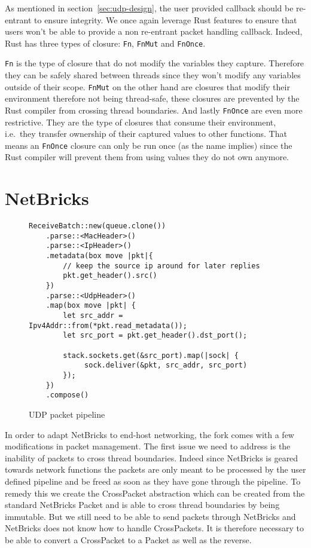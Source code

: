 As mentioned in section~\ref{sec:udp-design}, the user provided callback
should be re-entrant to ensure integrity. We once again leverage Rust
features to ensure that users won't be able to provide a non
re-entrant packet handling callback. Indeed, Rust has three types of
closure: \texttt{Fn}, \texttt{FnMut} and \texttt{FnOnce}.

\texttt{Fn} is the type of closure that do not modify the variables
they capture. Therefore they can be safely shared between threads
since they won't modify any variables outside of their
scope. \texttt{FnMut} on the other hand are closures that modify their
environment therefore not being thread-safe, these closures are
prevented by the Rust compiler from crossing thread boundaries. And
lastly \texttt{FnOnce} are even more restrictive. They are the type of
closures that consume their environment, i.e.\ they transfer ownership
of their captured values to other functions. That means an
\texttt{FnOnce} closure can only be run once (as the name implies)
since the Rust compiler will prevent them from using values they do
not own anymore.

\section{NetBricks} \label{sec:netbricks}

\begin{figure}[htb!]
\begin{lstlisting}
ReceiveBatch::new(queue.clone())
    .parse::<MacHeader>()
    .parse::<IpHeader>()
    .metadata(box move |pkt|{
        // keep the source ip around for later replies
        pkt.get_header().src()
    })
    .parse::<UdpHeader>()
    .map(box move |pkt| {
        let src_addr = Ipv4Addr::from(*pkt.read_metadata());
        let src_port = pkt.get_header().dst_port();

        stack.sockets.get(&src_port).map(|sock| {
             sock.deliver(&pkt, src_addr, src_port)
        });
    })
    .compose()
\end{lstlisting}

  \label{code:udp-pipeline}
  \caption{UDP packet pipeline}
\end{figure}

In order to adapt NetBricks to end-host networking, the fork comes
with a few modifications in packet management. The first issue we need
to address is the inability of packets to cross thread
boundaries. Indeed since NetBricks is geared towards network functions
the packets are only meant to be processed by the user defined
pipeline and be freed as soon as they have gone through the
pipeline. To remedy this we create the CrossPacket abstraction which
can be created from the standard NetBricks Packet and is able to cross
thread boundaries by being immutable. But we still need to be able to
send packets through NetBricks and NetBricks does not know how to
handle CrossPackets. It is therefore necessary to be able to convert a
CrossPacket to a Packet as well as the reverse.

